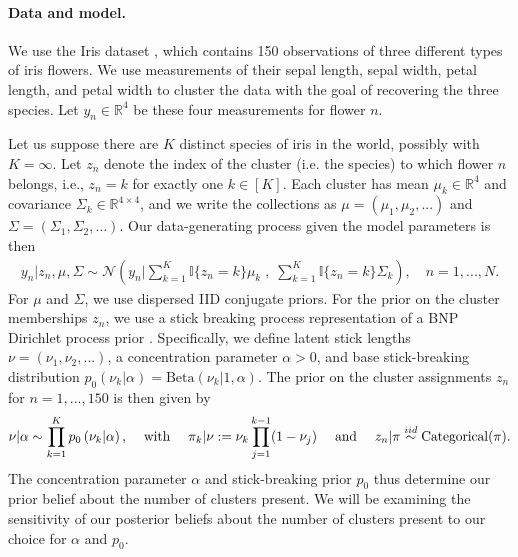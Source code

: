 \paragraph{Data and model.}
We use the Iris dataset \citep{iris_data_anderson, iris_data_fisher}, which
contains 150 observations of three different types of iris flowers. We use
measurements of their sepal length, sepal width, petal length, and petal width
to cluster the data with the goal of recovering the three species. Let $y_{n}\in
\mathbb{R}^4$ be these four measurements for flower $n$.

Let us suppose there are $K$ distinct species of iris in the world, possibly
with $K=\infty$. Let $z_n$ denote the index of the cluster (i.e. the species) to
which flower $n$ belongs, i.e., $z_n = k$ for exactly one $k\in [K]$. Each
cluster has mean $\mu_k\in \mathbb{R}^4$ and covariance $\Sigma_k \in
\mathbb{R}^{4\times 4}$, and we write the collections as $\mu = \left(\mu_1,
\mu_2, ...\right)$ and $\Sigma = \left(\Sigma_1, \Sigma_2, ... \right)$. Our
data-generating process given the model parameters is then
%
\begin{align*}
	y_n | z_n, \mu, \Sigma \sim
        \mathcal{N}\left(
            y_n \Big\vert
                \sum_{k=1}^K \mathbb{I}\{z_n = k\} \mu_k \;,
              \; \sum_{k=1}^K \mathbb{I}\{z_n = k\} \Sigma_k\right),
	\quad n = 1, ..., N.
\end{align*}
%
For $\mu$ and $\Sigma$, we use dispersed IID conjugate priors.
For the prior on the cluster memberships $z_n$, we use a stick breaking
process representation of a BNP Dirichlet process prior
\citep{ferguson:1973:bayesian, sethuraman:1994:constructivedp}. Specifically, we
define latent stick lengths $\nu=\left(\nu_1, \nu_2, ...\right)$, a
concentration parameter $\alpha>0$, and base stick-breaking distribution
$p_{0}\left(\nu_k \vert \alpha \right) = \mathrm{Beta}\left(\nu_k \Big\vert 1,
\alpha \right)$.  The prior on the cluster assignments $z_n$ for
$n=1,...,150$ is then given by
%
\begin{align}
\nu \vert \alpha \sim \prod_{k=1}^K p_{0}\left(\nu_k \vert \alpha \right)
\textrm{,}
    \quad\textrm{ with }\quad
\pi_k | \nu := \nu_k \prod_{j=1}^{k-1} (1 - \nu_j)
\quad\textrm{ and }\quad
z_n \vert \pi \stackrel{iid}{\sim} \mathrm{Categorical}(\pi). \label{eq:stick_breaking}
\end{align}
%
The concentration parameter $\alpha$ and stick-breaking prior $p_{0}$
thus determine our prior belief about the number of clusters present.
We will be examining the sensitivity of our posterior beliefs about the
number of clusters present to our choice for $\alpha$ and $p_{0}$.

